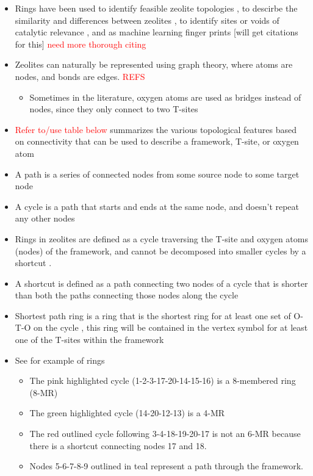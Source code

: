 \documentclass[11pt]{article}
\newcommand{\red}[1]{\textcolor{red}{#1}}
\begin{document}
\begin{itemize}
\item Rings have been used to identify feasible zeolite topologies \cite{li-why-2014}, to descirbe the similarity and differences between zeolites \cite{curtis-statistical-2003}, to identify sites or voids of catalytic relevance \cite{li-first-principles-2018,kester-effects-2021}, and as machine learning finger prints [will get citations for this] \red{need more thorough citing}

\item Zeolites can naturally be represented using graph theory, where atoms are nodes, and bonds are edges. \red{REFS}
\begin{itemize}
\item Sometimes in the literature, oxygen atoms are used as bridges instead of nodes, since they only connect to two T-sites
\end{itemize}
\item \red{Refer to/use table below}  summarizes the various topological features based on connectivity that can be used to describe a framework, T-site, or oxygen atom
\item A path is a series of connected nodes from some source node to some target node
\item A cycle is a path that starts and ends at the same node, and doesn't repeat any other nodes
\item Rings in zeolites are defined as a cycle traversing the T-site and oxygen atoms (nodes) of the framework, and cannot be decomposed into smaller cycles by a shortcut \cite{goetzke-properties-1991,guttman-ring-1990}.
\item A shortcut is defined as a path connecting two nodes of a cycle that is shorter than both the paths connecting those nodes along the cycle \cite{goetzke-properties-1991,guttman-ring-1990}
\item Shortest path ring is a ring that is the shortest ring for at least one set of O-T-O on the cycle \cite{sastre-topological-2009}, this ring will be contained in the vertex symbol for at least one of the T-sites within the framework
\item See  for example of rings
\begin{itemize}
\item The pink highlighted cycle (1-2-3-17-20-14-15-16) is a 8-membered ring (8-MR)
\item The green highlighted cycle (14-20-12-13) is a 4-MR
\item The red outlined cycle following 3-4-18-19-20-17 is not an 6-MR because there is a shortcut connecting nodes 17 and 18.
\item Nodes 5-6-7-8-9 outlined in teal represent a path through the framework.
\end{itemize}
\end{itemize}
\end{document}
